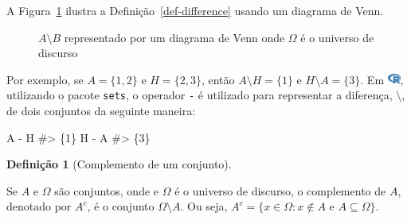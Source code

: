 \documentclass[
  letterpaper,
]{book}
\newenvironment{Shaded}{\begin{snugshade}}{\end{snugshade}}
\newcommand{\CommentTok}[1]{\textcolor[rgb]{0.37,0.37,0.37}{#1}}
\newcommand{\NormalTok}[1]{\textcolor[rgb]{0.00,0.23,0.31}{#1}}
\newcommand{\SpecialCharTok}[1]{\textcolor[rgb]{0.37,0.37,0.37}{#1}}
\theoremstyle{plain}
\theoremstyle{definition}
\newtheorem{definition}{Definição}[chapter]
\theoremstyle{remark}
\begin{document}
A Figura~\ref{fig-difference-venn-diagram} ilustra a
Definição~\ref{def-difference} usando um diagrama de Venn.

\begin{figure}


\caption{\label{fig-difference-venn-diagram}\(A \setminus B\)
representado por um diagrama de Venn onde \(\Omega\) é o universo de
discurso}

\end{figure}%

Por exemplo, se \(A = \{ 1, 2 \}\) e \(H = \{ 2, 3 \}\), então
\(A \setminus H = \{ 1 \}\) e \(H \setminus A = \{ 3 \}\). Em
\includegraphics[width=1.13em,height=1em]{naive_set_theory_files/figure-pdf/fa-icon-9b00320707d42527dde67262afb33ded.pdf},
utilizando o pacote \texttt{sets}, o operador \texttt{-} é utilizado
para representar a diferença, \(\setminus\), de dois conjuntos da
seguinte maneira:

\begin{Shaded}
\begin{Highlighting}[]
\NormalTok{A }\SpecialCharTok{{-}}\NormalTok{ H}
\CommentTok{\#\textgreater{} \{1\}}
\NormalTok{H }\SpecialCharTok{{-}}\NormalTok{ A}
\CommentTok{\#\textgreater{} \{3\}}
\end{Highlighting}
\end{Shaded}

\begin{definition}[Complemento de um
conjunto]\protect\hypertarget{def-complement}{}\label{def-complement}

Se \(A\) e \(\Omega\) são conjuntos, onde e \(\Omega\) é o universo de
discurso, o complemento de \(A\), denotado por \(A^c\), é o conjunto
\(\Omega \setminus A\). Ou seja,
\(A^c = \{x \in \Omega: x \notin A \text{ e } A \subseteq \Omega \}\).

\end{definition}
\end{document}
